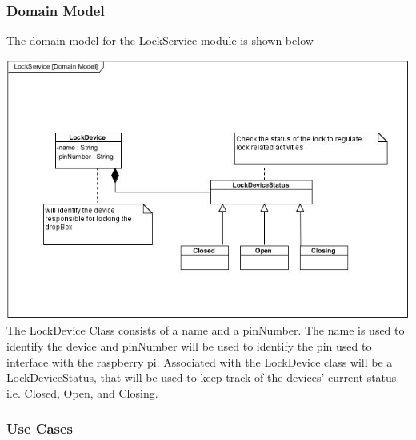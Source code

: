 \documentclass[a4paper,12pt]{article}
\begin{document}
	\subsubsection{Domain Model}
	The domain model for the LockService module is shown below
	
	\includegraphics[width=1\textwidth]{./Pictures/UML/LockServiceDomain.jpg}\\[0cm]	
	
	{\noindent}The LockDevice Class consists of a name and a pinNumber. The name is used to identify the device and pinNumber will be used to identify the pin used to interface with the raspberry pi. Associated with the LockDevice class will be a LockDeviceStatus, that will be used to keep track of the devices' current status i.e. Closed, Open, and Closing.
	
	\newpage
	\subsubsection{Use Cases}
	
\end{document}
